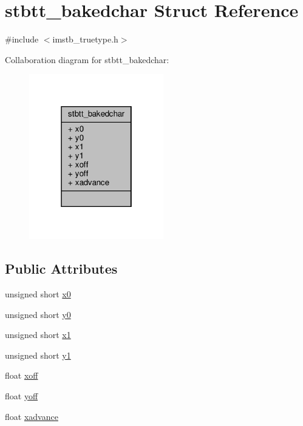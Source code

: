 \hypertarget{structstbtt__bakedchar}{}\section{stbtt\+\_\+bakedchar Struct Reference}
\label{structstbtt__bakedchar}


{\ttfamily \#include $<$imstb\+\_\+truetype.\+h$>$}



Collaboration diagram for stbtt\+\_\+bakedchar\+:
\nopagebreak
\begin{figure}[H]
\begin{center}
\leavevmode
\includegraphics[width=166pt]{structstbtt__bakedchar__coll__graph}
\end{center}
\end{figure}
\subsection*{Public Attributes}
\begin{DoxyCompactItemize}
\item 
unsigned short \hyperlink{structstbtt__bakedchar_a8011a0ed0410de9fa405c9cb1ab43da2}{x0}
\item 
unsigned short \hyperlink{structstbtt__bakedchar_aec4def12c086e0038ba32ff33ee78644}{y0}
\item 
unsigned short \hyperlink{structstbtt__bakedchar_a72c22c32abde95a5ba02925b8bd892bf}{x1}
\item 
unsigned short \hyperlink{structstbtt__bakedchar_ac831dc667f6c39b5d22740c6cbd5bc3f}{y1}
\item 
float \hyperlink{structstbtt__bakedchar_a0708a6588a2768b68a3ae59002944b7c}{xoff}
\item 
float \hyperlink{structstbtt__bakedchar_aba01393e52d1c6f4ce86a8b51e498bb4}{yoff}
\item 
float \hyperlink{structstbtt__bakedchar_ad77b35d1a849d9eb7edb91df05b10536}{xadvance}
\end{DoxyCompactItemize}


